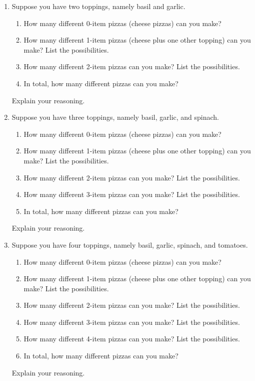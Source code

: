 \problems
\begin{enumerate}
\item Suppose you have two toppings, namely basil and garlic.
\begin{enumerate}
\item How many different 0-item pizzas (cheese pizzas) can you make?
\item How many different 1-item pizzas (cheese plus one other topping)
  can you make?  List the possibilities.
\item How many different 2-item pizzas can you make?  List the
  possibilities.
\item In total, how many different pizzas can you  make?
\end{enumerate}
Explain your reasoning.
\item Suppose you have three toppings, namely basil, garlic, and spinach.
\begin{enumerate}
\item How many different 0-item pizzas (cheese pizzas) can you make?
\item How many different 1-item pizzas (cheese plus one other
  topping) can you make?  List the possibilities.
\item How many different 2-item pizzas can you make?  List the
  possibilities.
\item How many different 3-item pizzas can you make?  List the
  possibilities.
\item In total, how many different pizzas can you  make?
\end{enumerate}
Explain your reasoning.
\item Suppose you have four toppings, namely basil, garlic, spinach,
  and tomatoes.
\begin{enumerate}
\item How many different 0-item pizzas (cheese pizzas) can you make?
\item How many different 1-item pizzas (cheese plus one other
  topping) can you make?  List the possibilities.
\item How many different 2-item pizzas can you make?  List the
  possibilities.
\item How many different 3-item pizzas can you make?  List the
  possibilities.
\item How many different 4-item pizzas can you make?  List the
  possibilities.
\item In total, how many different pizzas can you  make?
\end{enumerate}
Explain your reasoning.

\end{enumerate}
